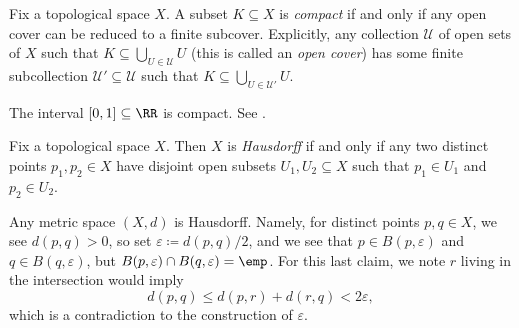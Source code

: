 \documentclass[../notes.tex]{subfiles}
\begin{document}
\begin{definition}[compact]
	Fix a topological space $X$. A subset $K\subseteq X$ is \textit{compact} if and only if any open cover can be reduced to a finite subcover. Explicitly, any collection $\mathcal U$ of open sets of $X$ such that $K\subseteq\bigcup_{U\in\mathcal U}U$ (this is called an \textit{open cover}) has some finite subcollection $\mathcal U'\subseteq\mathcal U$ such that $K\subseteq\bigcup_{U\in\mathcal U'}U$.
\end{definition}
\begin{example}
	The interval $[0,1]\subseteq\RR$ is compact. See \cite[Example~4.4]{elber-top}.
\end{example}
\begin{definition}[Hausdorff]
	Fix a topological space $X$. Then $X$ is \textit{Hausdorff} if and only if any two distinct points $p_1,p_2\in X$ have disjoint open subsets $U_1,U_2\subseteq X$ such that $p_1\in U_1$ and $p_2\in U_2$.
\end{definition}
\begin{example}
	Any metric space $(X,d)$ is Hausdorff. Namely, for distinct points $p,q\in X$, we see $d(p,q)>0$, so set $\varepsilon\coloneqq d(p,q)/2$, and we see that $p\in B(p,\varepsilon)$ and $q\in B(q,\varepsilon)$, but $B(p,\varepsilon)\cap B(q,\varepsilon)=\emp$. For this last claim, we note $r$ living in the intersection would imply
	\[d(p,q)\le d(p,r)+d(r,q)<2\varepsilon,\]
	which is a contradiction to the construction of $\varepsilon$.
\end{example}
\end{document}
